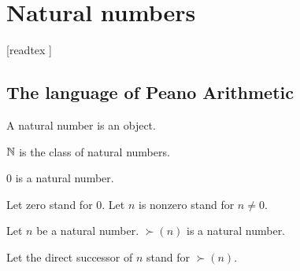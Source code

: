 \documentclass[../arithmetic.tex]{subfiles}
\begin{document}
  \chapter{Natural numbers}\label{chapter:natural-numbers}


  \begin{forthel}

    [readtex ]

  \end{forthel}


  \section{The language of Peano Arithmetic}

  \begin{forthel}
    \begin{signature}
      A natural number is an object.
    \end{signature}
  \end{forthel}

  \begin{forthel}
    \begin{definition}
      $\mathbb{N}$ is the class of natural numbers.
    \end{definition}
  \end{forthel}

  \begin{forthel}
    \begin{signature}
      $0$ is a natural number.
    \end{signature}

    Let zero stand for $0$.
    Let $n$ is nonzero stand for $n \neq 0$.
  \end{forthel}

  \begin{forthel}
    \begin{signature}
      Let $n$ be a natural number.
      $\succ(n)$ is a natural number.
    \end{signature}

    Let the direct successor of $n$ stand for $\succ(n)$.
  \end{forthel}
\end{document}
